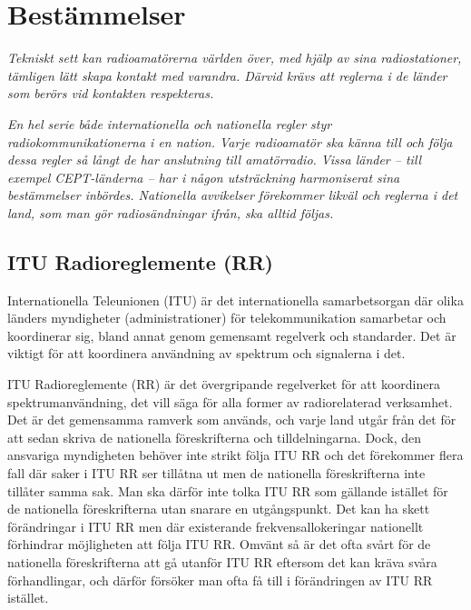\chapter{Bestämmelser}

\emph{Tekniskt sett kan radioamatörerna världen över, med hjälp av
  sina radiostationer, tämligen lätt skapa kontakt med varandra.
  Därvid krävs att reglerna i de länder som berörs vid kontakten respekteras.}

\emph{En hel serie både internationella och nationella regler styr
  radiokommunikationerna i en nation.
  Varje radioamatör ska känna till och följa dessa regler så långt de har
  anslutning till amatörradio.
  Vissa länder -- till exempel CEPT-länderna -- har i någon utsträckning harmoniserat
  sina bestämmelser inbördes.
  Nationella avvikelser förekommer likväl och reglerna i det land, som man gör
  radiosändningar ifrån, ska alltid följas.}

\section{ITU Radioreglemente (RR)}

Internationella Teleunionen (ITU) är det internationella samarbetsorgan där
olika länders myndigheter (administrationer) för telekommunikation samarbetar
och koordinerar sig, bland annat genom gemensamt regelverk och standarder.
Det är viktigt för att koordinera användning av spektrum och signalerna i det.

ITU Radioreglemente (RR) \cite{ITU-RR} är det övergripande regelverket för att
koordinera spektrumanvändning, det vill säga för alla former av
radiorelaterad verksamhet.
Det är det gemensamma ramverk som används, och varje land utgår från det för att
sedan skriva de nationella föreskrifterna och tilldelningarna.
Dock, den ansvariga myndigheten behöver inte strikt följa ITU RR och det
förekommer flera fall där saker i ITU RR ser tillåtna ut men de nationella
föreskrifterna inte tillåter samma sak.
Man ska därför inte tolka ITU RR som gällande istället för de nationella
föreskrifterna utan snarare en utgångspunkt.
Det kan ha skett förändringar i ITU RR men där existerande frekvensallokeringar
nationellt förhindrar möjligheten att följa ITU RR.
Omvänt så är det ofta svårt för de nationella föreskrifterna att gå utanför
ITU RR eftersom det kan kräva svåra förhandlingar, och därför försöker man ofta
få till i förändringen av ITU RR istället.

